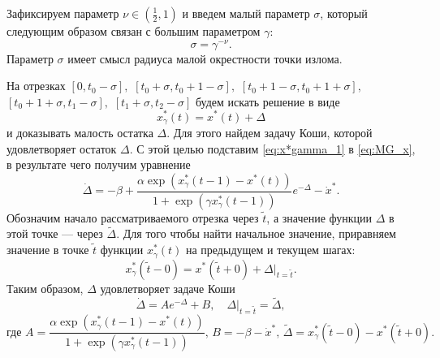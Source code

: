 Зафиксируем параметр $\nu\in(\frac{1}{2}, 1)$ и введем малый параметр $\sigma$, который следующим образом связан с большим параметром $\gamma$:  
%
\[\sigma=\gamma^{-\nu}.\]
%
Параметр $\sigma$ имеет смысл радиуса малой окрестности точки излома.

На отрезках 
$[0,t_0-\sigma],$ 
$[t_0+\sigma, t_0+1-\sigma],$ 
$[t_0+1-\sigma,t_0+1+\sigma],$ 
$[t_0+1+\sigma,t_1-\sigma],$ 
$[t_1+\sigma,t_2-\sigma]$ 
будем искать решение в виде
%
\begin{equation}
    \label{eq:x*gamma_1}
    x^*_\gamma(t) = x^*(t) + \Delta
\end{equation}
и доказывать малость остатка $\Delta$. Для этого найдем задачу Коши, которой удовлетворяет остаток $\Delta$. С этой целью подставим \eqref{eq:x*gamma_1} в \eqref{eq:MG_x}, в результате чего получим уравнение
%
\begin{equation*}
    \dot{\Delta} = -\beta + \frac{\alpha\exp(x_{\gamma}^*(t - 1) - x^*(t))}{1 + \exp(\gamma x_{\gamma}^*(t - 1))}e^{-\Delta}-\dot{x}^*.
\end{equation*}
%
Обозначим начало рассматриваемого отрезка через $\tilde{t}$, а значение функции $\Delta$ в этой точке --- через $\tilde{\Delta}$. Для того чтобы найти начальное значение, приравняем значение в точке $\tilde{t}$ функции $x_{\gamma}^*(t)$ на предыдущем и текущем шагах:
%
\[x_{\gamma}^*(\tilde{t}-0)=x^*(\tilde{t}+0)+\Delta|_{t=\tilde{t}}.\]
%
Таким образом, $\Delta$ удовлетворяет задаче Коши
\begin{equation}
        \label{eq:task_DeltaAB}
        \dot{\Delta}=A e^{-\Delta} + B,\quad \Delta|_{t=\tilde{t}}=\tilde{\Delta},
\end{equation}
%
\begin{equation}
    \label{AB_eq:x*gamma_1}
\text{где } A = \frac{\alpha\exp(x_{\gamma}^*(t - 1) - x^*(t))}{1+\exp(\gamma x_{\gamma}^*(t - 1))},\, 
B = -\beta-\dot{x}^*,\, 
\tilde{\Delta}=x_{\gamma}^*(\tilde{t} - 0) - x^*(\tilde{t} + 0).
\end{equation}

